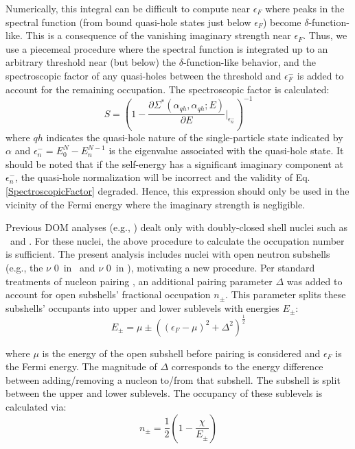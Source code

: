 \noindent
Numerically, this integral can be difficult to compute near $\epsilon_{F}$ where peaks in the
spectral function (from bound quasi-hole states just below $\epsilon_{F}$) become $\delta$-function-like. 
This is a consequence of the vanishing imaginary strength near $\epsilon_{F}$. Thus, we use a piecemeal procedure
where the spectral function is integrated up to an arbitrary threshold near (but below) the
$\delta$-function-like behavior, and the spectroscopic factor of any quasi-holes between the threshold and
$\epsilon_{F}^{-}$ is added to account for the remaining occupation. The spectroscopic factor is
calculated:
\begin{equation} \label{SpectroscopicFactor}
    S = \left(1-\frac{\partial\Sigma^{*}(\alpha_{qh},\alpha_{qh};E)}
    {\partial{E}}\bigg\rvert_{\epsilon_{n}^{-}}\right)^{-1}
\end{equation}
where $qh$ indicates the quasi-hole nature of the single-particle state indicated
by $\alpha$ and $\epsilon_{n}^{-} = E_{0}^{N}-E_{n}^{N-1}$ is the
eigenvalue associated with the quasi-hole state. It should be noted that if the
self-energy has a significant imaginary component at $\epsilon_{n}^{-}$, the
quasi-hole normalization will be incorrect and the validity of Eq.
\ref{SpectroscopicFactor} degraded. Hence, this expression should only be used
in the vicinity of the Fermi energy where the imaginary strength is negligible.

Previous DOM analyses (e.g., \cite{MahzoonPhDThesis}) dealt only with doubly-closed 
shell nuclei such as \caForty\ and \caEight.
For these nuclei, the above procedure to calculate the occupation number is
sufficient. The present analysis includes nuclei with open neutron subshells
(e.g., the $\nu$ 0\dFive\ in \oEight\ and $\nu$ 0\fFive\ in \niEight), motivating a new
procedure. Per standard treatments of nucleon pairing \cite{BohrAndMottleson}, an additional
pairing parameter $\Delta$ was added to account for open subshells' fractional occupation $n_{\pm}$.
This parameter splits these subshells' occupants into upper and lower sublevels with energies 
$E_{\pm}$:
\begin{equation}
    E_{\pm} = \mu \pm ((\epsilon_{F}-\mu)^{2} + \Delta^{2})^{\frac{1}{2}}
\end{equation}

\noindent
where $\mu$ is the energy of the open subshell before pairing is considered and
$\epsilon_{F}$ is the Fermi
energy. The magnitude of $\Delta$ corresponds to the energy difference between
adding/removing a nucleon to/from that subshell. The subshell
is split between the upper and lower sublevels. The occupancy of these sublevels is calculated via:
\begin{equation}
    n_{\pm} = \frac{1}{2}\left( 1-\frac{\chi}{E_{\pm}}\right)
\end{equation}

